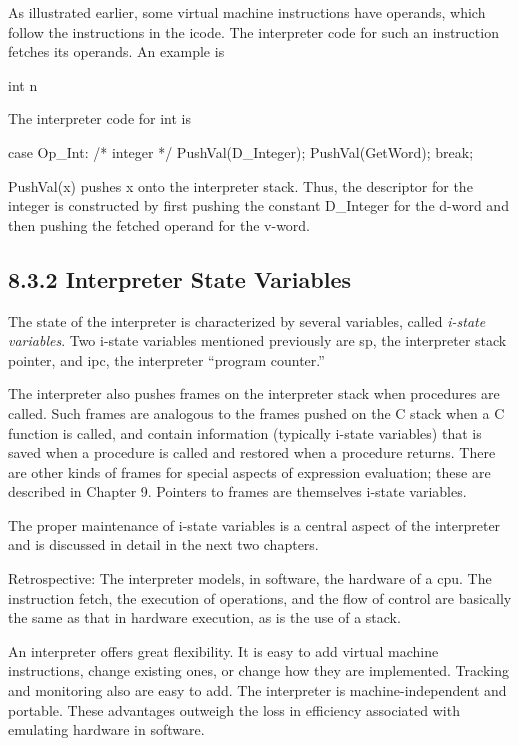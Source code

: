 As illustrated earlier, some virtual machine instructions have
operands, which follow the instructions in the icode. The interpreter
code for such an instruction fetches its operands. An example is

int n

The interpreter code for int is

case Op\_Int: /* integer */
   PushVal(D\_Integer);
   PushVal(GetWord);
   break;

PushVal(x) pushes x onto the interpreter stack. Thus, the descriptor
for the integer is constructed by first pushing the constant D\_Integer
for the d-word and then pushing the fetched operand for the v-word.

\subsection[8.3.2 Interpreter State Variables]{8.3.2 Interpreter State Variables}

The state of the interpreter is characterized by several variables,
called \textit{i-state variables}. Two i-state variables mentioned
previously are sp, the interpreter stack pointer, and ipc, the
interpreter ``program counter.''

The interpreter also pushes frames on the interpreter stack when
procedures are called. Such frames are analogous to the frames pushed
on the C stack when a C function is called, and contain information
(typically i-state variables) that is saved when a procedure is called
and restored when a procedure returns. There are other kinds of frames
for special aspects of expression evaluation; these are described in
Chapter 9. Pointers to frames are themselves i-state variables.

The proper maintenance of i-state variables is a central aspect of the
interpreter and is discussed in detail in the next two chapters.

Retrospective: The interpreter models, in software, the hardware of a
cpu. The instruction fetch, the execution of operations, and the flow
of control are basically the same as that in hardware execution, as is
the use of a stack.

An interpreter offers great flexibility. It is easy to add virtual
machine instructions, change existing ones, or change how they are
implemented. Tracking and monitoring also are easy to add. The
interpreter is machine-independent and portable. These advantages
outweigh the loss in efficiency associated with emulating hardware in
software.

